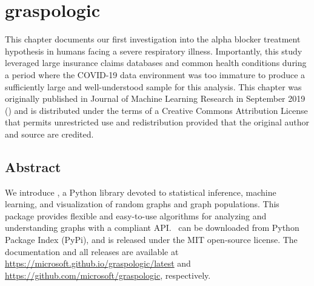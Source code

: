 \chapter{graspologic} \label{chap:graspologic}

This chapter documents our first investigation into the alpha blocker treatment hypothesis in humans facing a severe respiratory illness. Importantly, this study leveraged large insurance claims databases and common health conditions during a period where the COVID-19 data environment was too immature to produce a sufficiently large and well-understood sample for this analysis. This chapter was originally published in Journal of Machine Learning Research in September 2019 () and is distributed under the terms of a Creative Commons Attribution License that permits unrestricted use and redistribution provided that the original author and source are credited.


    

\pagebreak

\section*{Abstract}
We introduce \graspy, a Python library devoted to statistical inference, machine learning, and visualization of random graphs and graph populations. This package  provides flexible and easy-to-use algorithms for analyzing and understanding graphs with a \sklearn compliant API. \graspy ~can be downloaded from Python Package Index (PyPi), and is released under the MIT open-source license. The documentation and all releases are available at \url{https://microsoft.github.io/graspologic/latest} and \url{https://github.com/microsoft/graspologic}, respectively.
\pagebreak



